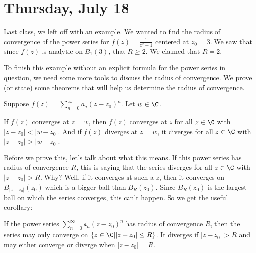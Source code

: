 \section{Thursday, July 18}


Last class, we left off with an example. We wanted to find the radius of convergence of the power series for $f(z)= \frac{1}{z^2 - 1}$ centered at $z_0 = 3$. We saw that since $f(z)$ is analytic on $B_1(3)$, that $R\ge 2$. We claimed that $R = 2$.

To finish this example without an explicit formula for the power series in question, we need some more tools to discuss the radius of convergence. We prove (or state) some theorems that will help us determine the radius of convergence.

\begin{thmbo}{}{} Suppose $f(z) = \sum_{n = 0}^\infty a_n(z-z_0)^n$. Let $w\in \C$.

If $f(z)$ converges at $z = w$, then $f(z)$ converges at $z$ for all $z\in \C$ with $|z-z_0| < |w-z_0|$. And if $f(z)$ diverges at $z = w$, it diverges for all $z\in\C$ with $|z-z_0| > |w-z_0|$.
\end{thmbo}

Before we prove this, let's talk about what this means. If this power series has radius of convergence $R$, this is saying that the series diverges for all $z\in\C$ with $|z-z_0| > R$. Why? Well, if it converges at such a $z$, then it converges on $B_{|z-z_0|}(z_0)$ which is a bigger ball than $B_R(z_0)$. Since $B_R(z_0)$ is the largest ball on which the series converges, this can't happen. So we get the useful corollary:

\begin{corbo}{}{} If the power series $ \sum_{n = 0}^\infty a_n(z-z_0)^n$ has radius of convergence $R$, then the series may only converge on $\{z\in\C||z-z_0|\le R\}$. It diverges if $|z-z_0| > R$ and may either converge or diverge when $|z-z_0| = R$.
\end{corbo}

